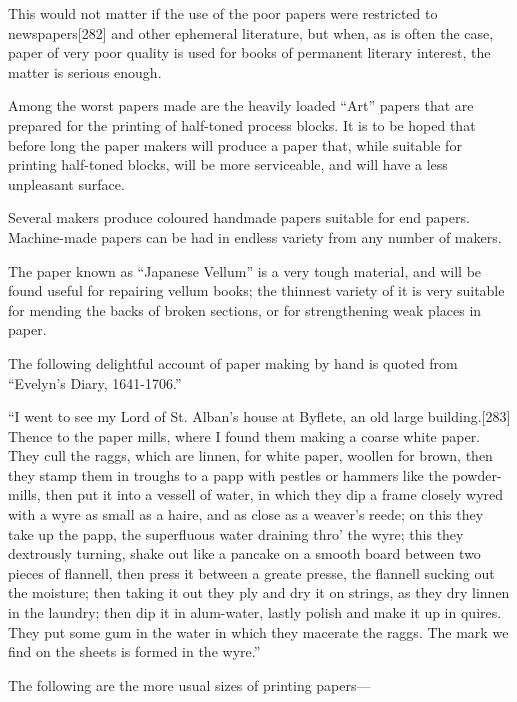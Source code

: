 \documentclass[
]{article}
\begin{document}
This would not matter if the use of the poor papers were restricted to
newspapers{\protect\hypertarget{Page_282}{}{{[}282{]}}} and other
ephemeral literature, but when, as is often the case, paper of very poor
quality is used for books of permanent literary interest, the matter is
serious enough.

Among the worst papers made are the heavily loaded ``Art'' papers that
are prepared for the printing of half-toned process blocks. It is to be
hoped that before long the paper makers will produce a paper that, while
suitable for printing half-toned blocks, will be more serviceable, and
will have a less unpleasant surface.

Several makers produce coloured handmade papers suitable for end papers.
Machine-made papers can be had in endless variety from any number of
makers.

The paper known as ``Japanese Vellum'' is a very tough material, and
will be found useful for repairing vellum books; the thinnest variety of
it is very suitable for mending the backs of broken sections, or for
strengthening weak places in paper.

The following delightful account of paper making by hand is quoted from
``Evelyn's Diary, 1641-1706.''

``I went to see my Lord of St. Alban's house at Byflete, an old large
building.{\protect\hypertarget{Page_283}{}{{[}283{]}}} Thence to the
paper mills, where I found them making a coarse white paper. They cull
the raggs, which are linnen, for white paper, woollen for brown, then
they stamp them in troughs to a papp with pestles or hammers like the
powder-mills, then put it into a vessell of water, in which they dip a
frame closely wyred with a wyre as small as a haire, and as close as a
weaver's reede; on this they take up the papp, the superfluous water
draining thro' the wyre; this they dextrously turning, shake out like a
pancake on a smooth board between two pieces of flannell, then press it
between a greate presse, the flannell sucking out the moisture; then
taking it out they ply and dry it on strings, as they dry linnen in the
laundry; then dip it in alum-water, lastly polish and make it up in
quires. They put some gum in the water in which they macerate the raggs.
The mark we find on the sheets is formed in the wyre.''

The following are the more usual sizes of printing papers---
\end{document}
